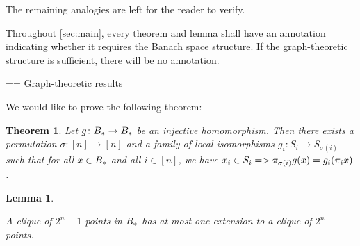 \documentclass{amsart}
\newtheorem{theorem}{Theorem}
\newtheorem{lemma}{Lemma}
\theoremstyle{definition}
\begin{document}
The remaining analogies are left for the reader to verify.

Throughout \autoref{sec:main}, every theorem and lemma shall have an annotation indicating whether it requires the Banach space structure. If the graph-theoretic structure is sufficient, there will be no annotation.

== Graph-theoretic results

We would like to prove the following theorem:

\begin{theorem} \label{thm:factors}
Let $g  \colon  B_* \to B_*$ be an injective homomorphism. Then there exists a permutation $\sigma \colon  [n]\to[n]$ and a family of local isomorphisms $g_i  \colon  S_i \to S_{\sigma(i)}$ such that for all $x \in B_*$ and all $i \in [n]$, we have $x_i \in S_i => \pi_{\sigma(i)}g(x) = g_i (\pi_i x)$.\end{theorem}

\begin{lemma} \label{lem:clique-ext}

  A clique of $2^n-1$ points in $B_*$ has at most one extension
to a clique of $2^n$ points.
\end{lemma}
\end{document}
